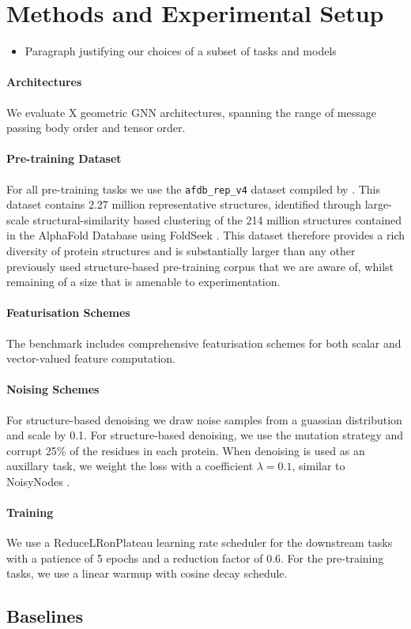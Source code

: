 \section{Methods and Experimental Setup}
\begin{itemize}
    \item Paragraph justifying our choices of a subset of tasks and models
\end{itemize}


\paragraph{Architectures}
We evaluate X geometric GNN architectures, spanning the range of message passing body order and tensor order. 


\paragraph{Pre-training Dataset} For all pre-training tasks we use the \texttt{afdb\_rep\_v4} dataset compiled by \citet{BarrioHernandez2023}. This dataset contains 2.27 million representative structures, identified through large-scale structural-similarity based clustering of the 214 million structures contained in the AlphaFold Database \cite{Varadi2021} using FoldSeek \cite{vanKempen2023}. This dataset therefore provides a rich diversity of protein structures and is substantially larger than any other previously used structure-based pre-training corpus that we are aware of, whilst remaining of a size that is amenable to experimentation.

\paragraph{Featurisation Schemes}
The benchmark includes comprehensive featurisation schemes for both scalar and vector-valued feature computation. 


\paragraph{Noising Schemes} For structure-based denoising we draw noise samples from a guassian distribution and scale by 0.1. For structure-based denoising, we use the mutation strategy and corrupt 25\% of the residues in each protein. When denoising is used as an auxillary task, we weight the loss with a coefficient $\lambda = 0.1$, similar to NoisyNodes \cite{godwin2021simple}.

\paragraph{Training}
We use a ReduceLRonPlateau learning rate scheduler for the downstream tasks with a patience of 5 epochs and a reduction factor of 0.6. For the pre-training tasks, we use a linear warmup with cosine decay schedule.



\subsection{Baselines}